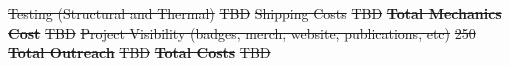 \documentclass[a4paper,12pt,twoside]{article}
\providecommand{\DIFdeltex}[1]{{\protect\color{red}\sout{#1}}}                      %
\providecommand{\DIFaddbegin}{} %
\providecommand{\DIFdelend}{} %
\providecommand{\DIFdel}[1]{\texorpdfstring{\DIFdeltex{#1}}{}} %
\newcommand{\DIFaddincludegraphics}[2][]{{\color{blue}\fbox{\DIFOincludegraphics[#1]{#2}}}} %
\DeclareRobustCommand{\DIFaddbegin}{\DIFOaddbegin \let\includegraphics\DIFaddincludegraphics} %
\DeclareRobustCommand{\DIFdelend}{\DIFOaddend \let\includegraphics\DIFOincludegraphics} %
\begin{document}
\DIFdel{Testing (Structural and Thermal) }%
\DIFdel{TBD }%
\DIFdel{Shipping Costs }%
\DIFdel{TBD }%
\textbf{\DIFdel{Total Mechanics Cost}} %
\DIFdel{TBD }%
\DIFdel{Project Visibility (badges, merch, website, publications, etc) }%
\DIFdel{250}%
\textbf{\DIFdel{Total Outreach}} %
\DIFdel{TBD }%
\textbf{\DIFdel{Total Costs}} %
\DIFdel{TBD }%
\DIFdelend %
\DIFaddbegin 
\end{document}
